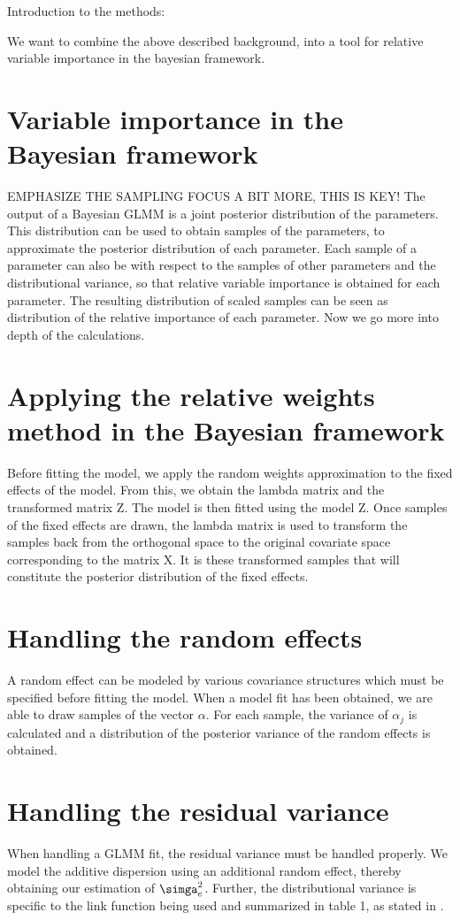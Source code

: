 Introduction to the methods:

We want to combine the above described background, into a tool for relative variable importance in the bayesian framework. 

\section{Variable importance in the Bayesian framework}
EMPHASIZE THE SAMPLING FOCUS A BIT MORE, THIS IS KEY!
The output of a Bayesian GLMM is a joint posterior distribution of the parameters. This distribution can be used to obtain samples of the parameters, to approximate the posterior distribution of each parameter. Each sample of a parameter can also be with respect to the samples of other parameters and the distributional variance, so that relative variable importance is obtained for each parameter. The resulting distribution of scaled samples can be seen as distribution of the relative importance of each parameter. Now we go more into depth of the calculations. 

\section{Applying the relative weights method in the Bayesian framework}
Before fitting the model, we apply the random weights approximation to the fixed effects of the model. From this, we obtain the lambda matrix and the transformed matrix Z. The model is then fitted using the model Z. Once samples of the fixed effects are drawn, the lambda matrix is used to transform the samples back from the orthogonal space to the original covariate space corresponding to the matrix X. It is these transformed samples that will constitute the posterior distribution of the fixed effects.

\section{Handling the random effects}
A random effect can be modeled by various covariance structures which must be specified before fitting the model. When a model fit has been obtained, we are able to draw samples of the vector $\alpha$. For each sample, the variance of $\alpha_j$ is calculated and a distribution of the posterior variance of the random effects is obtained. 

\section{Handling the residual variance}
When handling a GLMM fit, the residual variance must be handled properly. We model the additive dispersion using an additional random effect, thereby obtaining our estimation of $\simga_e^2$. Further, the distributional variance is specific to the link function being used and summarized in table 1, as stated in \citet{nakagawa2013general}.

